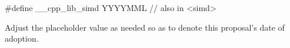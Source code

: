 \begin{wgText}
  \begin{codeblock}
    #define __cpp_lib_simd YYYYMML // also in <simd>
  \end{codeblock}
\end{wgText}
Adjust the placeholder value as needed so as to denote this proposal's date of adoption.

\begin{wgText}
  \setcounter{WGClause}{28}
  \setcounter{WGSubSection}{8}
  
\end{wgText}


